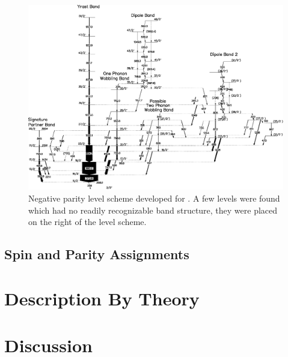 \begin{landscape}
\begin{figure}[h!]
\centerline{\includegraphics[height=\textheight]{./img/c4/135Pr_Np_for_diss.eps}}
	\caption{Negative parity level scheme developed for \pr{}. A few levels were found which had no readily recognizable band structure, they were placed on the right of the level scheme. \label{fig:chp4-neg-par-lvl-schm}}
\end{figure}
\end{landscape}

\subsection{Spin and Parity Assignments}
\label{ssec:trw-lvl-scheme-assignments}

\section{Description By Theory}
\label{sec:trw-theory-desc}

\section{Discussion}
\label{sec:trw-discussion}